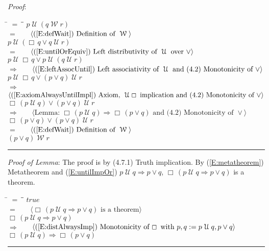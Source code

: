 \documentclass[12pt, fleqn, leqno]{article}
\newcommand{\lgap}{2pt}                             %
\newcommand{\mymathindent}{24pt}                    %
\newcommand{\impl}{\ensuremath{\Rightarrow}}        %
\newcommand{\Until}{\;\mathcal{U}\;}
\newcommand{\Wait}{\;\mathcal{W}\;}
\newcommand{\Always}{\Box\,}
\newcommand{\myqed}{\rule[-.23ex]{1.2ex}{2.0ex}}
\newcommand{\myqedtab}{\hspace{384pt}}              %
\newcommand{\Gll} {\langle}                         %
\newcommand{\Ggg} {\rangle}                         %
\newcommand{\Hint}[1]     {\ \ \ $\Gll              \mbox{#1} \Ggg$ }   %
\begin{document}
\emph{Proof}:
\begin{tabbing}
\hspace{\mymathindent} \= $= \;$ \= \myqedtab \= \kill
\> \>   $p \Until (q \Wait r)$\\[\lgap]
\> $=$ \> \Hint{(\ref{E:defWait}) Definition of $\Wait$} \\[\lgap]
\> \>   $p\Until (\Always q \lor q\Until r)$\\[\lgap]
\> $=$  \>  \Hint{(\ref{E:untilOrEquiv}) Left distributivity of $\Until$ over $\lor$}\\[\lgap]
\> \>   $p\Until \Always q \lor p\Until (q\Until r)$\\[\lgap]
\> $\impl$ \> \Hint{(\ref{E:leftAssocUntil}) Left associativity of $\Until$ and (4.2) Monotonicity of $\lor$} \\[\lgap]
\> \>   $p\Until \Always q \lor (p\lor q)\Until r$\\[\lgap]
\> $\impl$ \> \Hint{(\ref{E:axiomAlwaysUntilImpl}) Axiom, $\Until\Always$ implication and (4.2) Monotonicity of $\lor$} \\[\lgap]
\> \>   $\Always (p\Until q) \lor (p\lor q)\Until r$\\[\lgap]
  \> $\impl$  \>  \Hint{Lemma: $\Always (p \Until q) \impl \Always (p \lor q)$ and (4.2) Monotonicity of $\lor$}\\[\lgap]
\> \>   $\Always (p \lor q) \lor (p\lor q) \Until r$\\[\lgap]
\> $=$ \> \Hint{(\ref{E:defWait}) Definition of $\Wait$} \\[\lgap]
\> \>   $(p\lor q) \Wait r$ \quad \myqed
\end{tabbing}

\emph{Proof of Lemma}: The proof is by (4.7.1) Truth implication.
By (\ref{E:metatheorem}) Metatheorem and (\ref{E:untilImpOr}) $p \Until q \impl p \lor q$, $\Always (p \Until q \impl p \lor q)$ is a theorem.
\begin{tabbing}
\hspace{\mymathindent} \= $= \;$ \= \myqedtab \= \kill
  \> \>   $true$\\[\lgap]
  \> $=$ \> \Hint{$\Always (p \Until q \impl p \lor q)$ is a theorem} \\[\lgap]
  \> \>   $\Always (p \Until q \impl p \lor q)$\\[\lgap]
  \> $\impl$  \>  \Hint{(\ref{E:distAlwaysImp}) Monotonicity of $\Always$ with $p, q :=  p\Until q, p\lor q$}\\[\lgap]
  \> \>   $\Always (p \Until q) \impl \Always (p \lor q)$ \quad \myqed
\end{tabbing}
\end{document}
